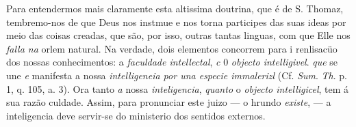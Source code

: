 Para entendermos mais claramente esta altissima doutrina, que é de S. Thomaz, tembremo-nos de que Deus nos instmue e nos torna participes das suas ideas por meio das coisas creadas, que são, por isso, outras tantas linguas, com que Elle nos \emph{falla na} orlem natural. Na verdade, dois elementos concorrem para i renlisacüo dos nossas conhecimentos: a \emph{faculdade intellectal}, \emph{c} 0 \emph{objecto intelligivel}. \emph{que} se une \emph{e} manifesta a nossa \emph{intelligeneia por una especie immalerizl} (Cf. \emph{Sum}. \emph{Th}. p. 1, q. 105, a. 3). Ora tanto \emph{a} nossa \emph{inteligencia}, \emph{quanto} o \emph{objecto intelligicel}, tem á sua razão   culdade. Assim, para pronunciar este juizo --- o hrundo \emph{existe}, --- a inteligencia deve servir-se do ministerio dos sentidos externos.

